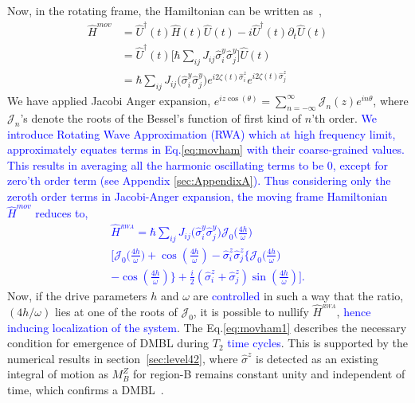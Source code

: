 \documentclass[%
reprint,
superscriptaddress,
amsmath,amssymb,showkeys,
aps,
prb,
]{revtex4-2}
\newcommand{\blue}[1]{\textcolor{blue}{#1}}
\begin{document}
	Now, in the rotating frame, the Hamiltonian can be written as~\cite{haldar_dynamical_2021},
	\begin{align}
		\hat{H}^{mov} &= \hat{U}^\dagger(t) \hat{H}(t) \hat{U}(t)- i \hat{U}^\dagger(t) \partial_t \hat{U}(t)\nonumber\\
		&= \hat{U}^\dagger(t) \big[\hbar\sum_{ij}J_{ij}\hat{\sigma}^y_i\hat{\sigma}^y_j\big] \hat{U}(t)\nonumber\\
		&=\hbar\sum_{ij} J_{ij} \Big(\hat{\sigma}^y_i\hat{\sigma}^y_j\Big) e^{i 2\zeta(t) \hat{\sigma}^z_i}  e^{i 2\zeta(t) \hat{\sigma}^z_j}
		\label{eq:movham}
	\end{align}
	We have applied Jacobi Anger expansion, $\displaystyle e^{iz \cos(\theta)} = \sum_{n=-\infty}^{\infty} \mathcal{J}_n(z) e^{in\theta}$, where $\mathcal{J}_n$'s denote the roots of the Bessel's function of first kind of $n$'th order. \blue{We introduce Rotating Wave Approximation (RWA) which at high frequency limit, approximately equates terms in Eq.\eqref{eq:movham} with their coarse-grained values. This results in averaging all the harmonic oscillating terms to be 0, except for zero'th order term (see Appendix \ref{sec:AppendixA}). Thus considering only the zeroth order terms in Jacobi-Anger expansion, the moving frame Hamiltonian $\hat{H}^{mov}$ reduces to,
		\begin{multline}
			\hat{H}^{_{RWA}} = \hbar\sum_{ij} J_{ij} \Big(\hat{\sigma}^y_i\hat{\sigma}^y_j\Big) \mathcal{J}_0\Big(\frac{4h}{\omega}\Big)\\
			\Bigg[\mathcal{J}_0\Big(\frac{4h}{\omega}\Big) + \cos(\frac{4h}{\omega})-\hat{\sigma}^z_i\hat{\sigma}^z_j \bigg\{\mathcal{J}_0\Big(\frac{4h}{\omega}\Big)\\
			- \cos(\frac{4h}{\omega})\bigg\} + \frac{i}{2} (\hat{\sigma}^z_i + \hat{\sigma}^z_j) \sin(\frac{4h}{\omega})\Bigg].
			\label{eq:movham1}
	\end{multline}}
	Now, if the drive parameters $h$ and $\omega$  are \blue{controlled} in such a way that the ratio, $({4h}/{\omega})$ lies at one of the roots of $\mathcal{J}_0$, it is possible to nullify $\hat{H}^{_{RWA}}$, \blue{hence inducing localization of the system}. The Eq.\eqref{eq:movham1} describes the necessary condition for emergence of DMBL during $T_2$ \blue{time cycles}. This is supported by the numerical results in section~\ref{sec:level42}, where $\hat{\sigma}^z$ is detected as an existing integral of motion as $M^Z_B$ for region-B remains constant unity and independent of time, which confirms a DMBL~\cite{Keser2016,Dodonov1978}. 
	
\end{document}
